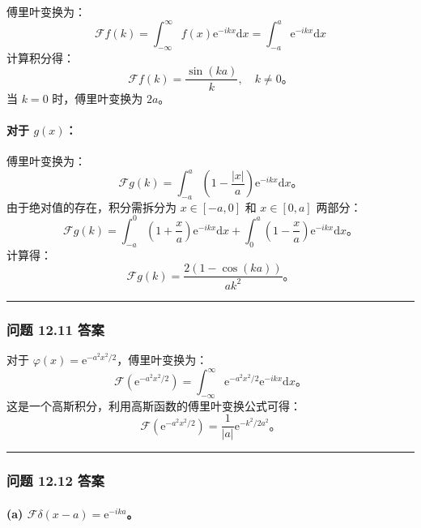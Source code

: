 傅里叶变换为：
 $$
\mathcal{F}f(k) = \int_{-\infty}^\infty f(x) \mathrm{e}^{-i k x} \mathrm{d}x = \int_{-a}^a \mathrm{e}^{-i k x} \mathrm{d}x
$$
计算积分得：
 $$
\mathcal{F}f(k) = \frac{\sin(ka)}{k}, \quad k \neq 0。
$$
当 $k = 0$ 时，傅里叶变换为 $2a$。

\paragraph{\texorpdfstring{对于
$g(x)$：}{对于 g(x)：}}

傅里叶变换为：
 $$
\mathcal{F}g(k) = \int_{-a}^a \left(1 - \frac{|x|}{a}\right) \mathrm{e}^{-i k x} \mathrm{d}x。
$$
由于绝对值的存在，积分需拆分为 $x \in [-a, 0]$ 和 $x \in [0, a]$
两部分：
 $$
\mathcal{F}g(k) = \int_{-a}^0 \left(1 + \frac{x}{a}\right) \mathrm{e}^{-i k x} \mathrm{d}x + \int_{0}^a \left(1 - \frac{x}{a}\right) \mathrm{e}^{-i k x} \mathrm{d}x。
$$
计算得：
 $$
\mathcal{F}g(k) = \frac{2(1 - \cos(ka))}{a k^2}。
$$
\begin{center}\rule{0.5\linewidth}{0.5pt}\end{center}

\subsubsection{问题 12.11 答案}

对于 $\varphi(x) = \mathrm{e}^{-a^2 x^2 / 2}$，傅里叶变换为：
 $$
\mathcal{F}\left(\mathrm{e}^{-a^2 x^2 / 2}\right) = \int_{-\infty}^\infty \mathrm{e}^{-a^2 x^2 / 2} \mathrm{e}^{-i k x} \mathrm{d}x。
$$
这是一个高斯积分，利用高斯函数的傅里叶变换公式可得：
 $$
\mathcal{F}\left(\mathrm{e}^{-a^2 x^2 / 2}\right) = \frac{1}{|a|} \mathrm{e}^{-k^2 / 2a^2}。
$$
\begin{center}\rule{0.5\linewidth}{0.5pt}\end{center}

\subsubsection{问题 12.12 答案}\label{ux95eeux9898-12.12-ux7b54ux6848}

\paragraph{\texorpdfstring{(a)
$\mathcal{F}\delta(x-a) = \mathrm{e}^{-i k a}$。}{(a) \textbackslash mathcal\{F\}\textbackslash delta(x-a) = \textbackslash mathrm\{e\}\^{}\{-i k a\}。}}\label{a-mathcalfdeltax-a-mathrme-i-k-a}

